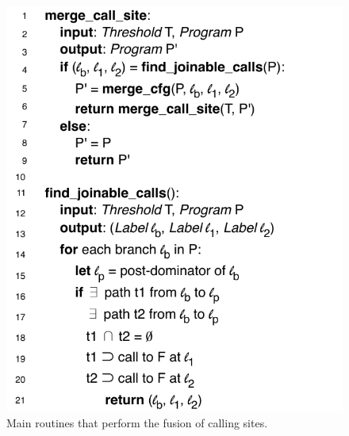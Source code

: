 \documentclass[times,10pt,twocolumn]{article}
\begin{document}
\begin{figure}[hbt]
\begin{center}
\includegraphics[width=1\columnwidth]{images/Algorithm0}
\end{center}
\caption{\label{fig:Algorithm0}
Main routines that perform the fusion of calling sites.}
\end{figure}
\end{document}
